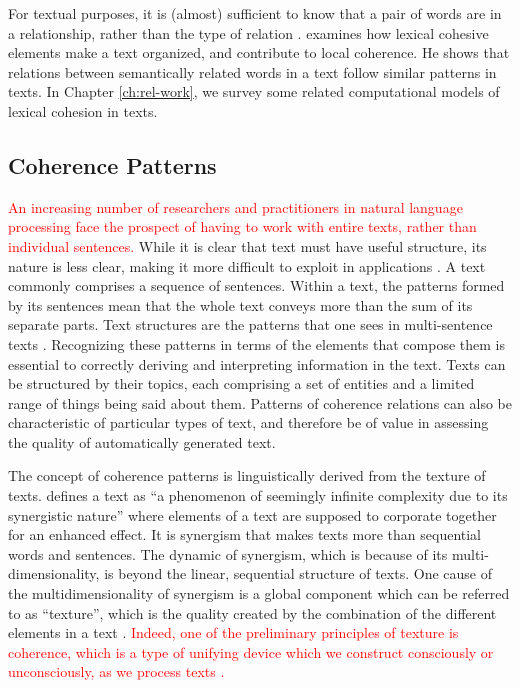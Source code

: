 For textual purposes, it is (almost) sufficient to know that a pair of words are in a relationship, rather than the type of relation \cite{halliday76}. %
 examines how lexical cohesive elements make a text organized, and contribute to local coherence. 
He shows that relations between semantically related words in a text follow similar patterns in texts. 
In Chapter \ref{ch:rel-work}, we survey some related computational models of lexical cohesion in texts. 


\subsection{Coherence Patterns}

\textcolor{red}{An increasing number of researchers and practitioners in natural language processing face the prospect of having to work with entire texts, rather than individual sentences. }
While it is clear that text must have useful structure, its nature is less clear, making it more difficult to exploit in applications \cite{webber12a}. 
A text commonly comprises a sequence of sentences. 
Within a text, the patterns formed by its sentences mean that the whole text conveys more than the sum of its separate parts. 
Text structures are the patterns that one sees in \mbox{multi-sentence} texts \cite{webber12a}. 
Recognizing these patterns in terms of the elements that compose them is essential to correctly deriving and interpreting information in the text. 
Texts can be structured by their topics, each comprising a set of entities and a limited range of things being said about them. 
Patterns of coherence relations can also be characteristic of particular types of text, and therefore be of value in assessing the quality of automatically generated text. 

The concept of coherence patterns is linguistically derived from the texture of texts. 
 defines a text as ``a phenomenon of seemingly infinite complexity due to its synergistic nature'' where elements of a text are supposed to corporate together for an enhanced effect. 
It is synergism that makes texts more than sequential words and sentences. 
The dynamic of synergism, which is because of its multi-dimensionality, is beyond the linear, sequential structure of texts. 
One cause of the multidimensionality of synergism is a global component which can be referred to as ``texture'', which is the quality created by the combination of the different elements in a text \cite{stoddard91}. 
\textcolor{red}{Indeed, one of the preliminary principles of texture is coherence, which is a type of unifying device which we construct consciously or unconsciously, as we process texts \cite{halliday76}.}

